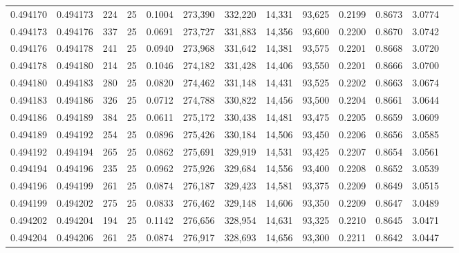 \begin{tabular}{rrrrrrrrrrrrr}
0.494170 & 0.494173 &   224 &  25 &                                     0.1004 & 273,390 & 332,220 &  14,331 &  93,625 & 0.2199 & 0.8673 & 3.0774 \\
0.494173 & 0.494176 &   337 &  25 &                                     0.0691 & 273,727 & 331,883 &  14,356 &  93,600 & 0.2200 & 0.8670 & 3.0742 \\
0.494176 & 0.494178 &   241 &  25 &                                     0.0940 & 273,968 & 331,642 &  14,381 &  93,575 & 0.2201 & 0.8668 & 3.0720 \\
0.494178 & 0.494180 &   214 &  25 &                                     0.1046 & 274,182 & 331,428 &  14,406 &  93,550 & 0.2201 & 0.8666 & 3.0700 \\
0.494180 & 0.494183 &   280 &  25 &                                     0.0820 & 274,462 & 331,148 &  14,431 &  93,525 & 0.2202 & 0.8663 & 3.0674 \\
0.494183 & 0.494186 &   326 &  25 &                                     0.0712 & 274,788 & 330,822 &  14,456 &  93,500 & 0.2204 & 0.8661 & 3.0644 \\
0.494186 & 0.494189 &   384 &  25 &                                     0.0611 & 275,172 & 330,438 &  14,481 &  93,475 & 0.2205 & 0.8659 & 3.0609 \\
0.494189 & 0.494192 &   254 &  25 &                                     0.0896 & 275,426 & 330,184 &  14,506 &  93,450 & 0.2206 & 0.8656 & 3.0585 \\
0.494192 & 0.494194 &   265 &  25 &                                     0.0862 & 275,691 & 329,919 &  14,531 &  93,425 & 0.2207 & 0.8654 & 3.0561 \\
0.494194 & 0.494196 &   235 &  25 &                                     0.0962 & 275,926 & 329,684 &  14,556 &  93,400 & 0.2208 & 0.8652 & 3.0539 \\
0.494196 & 0.494199 &   261 &  25 &                                     0.0874 & 276,187 & 329,423 &  14,581 &  93,375 & 0.2209 & 0.8649 & 3.0515 \\
0.494199 & 0.494202 &   275 &  25 &                                     0.0833 & 276,462 & 329,148 &  14,606 &  93,350 & 0.2209 & 0.8647 & 3.0489 \\
0.494202 & 0.494204 &   194 &  25 &                                     0.1142 & 276,656 & 328,954 &  14,631 &  93,325 & 0.2210 & 0.8645 & 3.0471 \\
0.494204 & 0.494206 &   261 &  25 &                                     0.0874 & 276,917 & 328,693 &  14,656 &  93,300 & 0.2211 & 0.8642 & 3.0447 \\

\end{tabular}
